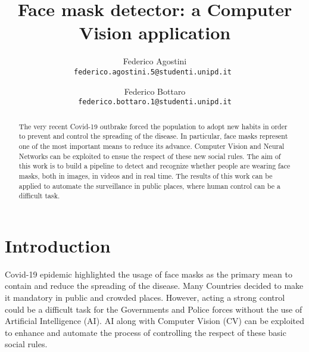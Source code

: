\documentclass[10pt,twocolumn,letterpaper]{article}
\begin{document}
\title{Face mask detector: a Computer Vision application}

\author{Federico Agostini\\
{\tt\small federico.agostini.5@studenti.unipd.it }
\and
Federico Bottaro\\
{\tt\small federico.bottaro.1@studenti.unipd.it}
}

\maketitle

\begin{abstract}
The very recent Covid-19 outbrake forced the population to adopt new habits in order to prevent and control the spreading of the disease. In particular, face masks represent one of the most important means to reduce its advance. Computer Vision and Neural Networks can be exploited to ensue the respect of these new social rules. The aim of this work is to build a pipeline to detect and recognize whether people are wearing face masks, both in images, in videos and in real time. The results of this work can be applied to automate the surveillance in public places, where human control can be a difficult task.

\end{abstract}


\section{Introduction}
\label{sec:introduction}
Covid-19 epidemic highlighted the usage of face masks as the primary mean to contain and reduce the spreading of the disease. Many Countries decided to make it mandatory in public and crowded places. However, acting a strong control could be a difficult task for the Governments and Police forces without the use of Artificial Intelligence (AI). AI along with Computer Vision (CV) can be exploited to enhance and automate the process of controlling the respect of these basic social rules.
\end{document}
